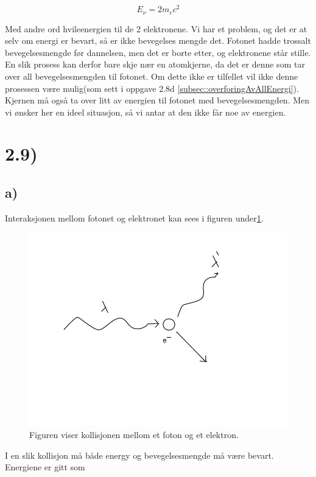 \documentclass[a4paper,norsk, 10pt]{article}
\begin{document}
$$
E_{\nu} = 2m_ec^2
$$

Med andre ord hvileenergien til de 2 elektronene. Vi har et problem, og det er at selv om energi er bevart, så er ikke bevegelses mengde det. Fotonet hadde trossalt bevegelsesmengde før dannelsen, men det er borte etter, og elektronene står stille. En slik prosess kan derfor bare skje nær en atomkjerne, da det er denne som tar over all bevegelsesmengden til fotonet. Om dette ikke er tilfellet vil ikke denne prosessen være mulig(som sett i oppgave 2.8d \ref{subsec::overforingAvAllEnergi}). Kjernen må også ta over litt av energien til fotonet med bevegelsesmengden. Men vi ønsker her en ideel situasjon, så vi antar at den ikke får noe av energien.

\section*{2.9)}

\subsection*{a)}
Interaksjonen mellom fotonet og elektronet kan sees i figuren under\ref{fig::photonElectronCollision}.

\begin{figure}[H]
\centering
\includegraphics[scale=.3]{comptonLambda.png}
\caption{Figuren viser kollisjonen mellom et foton og et elektron.}\label{fig::photonElectronCollision}
\end{figure}

I en slik kollisjon må både energy og bevegelsesmengde må være bevart. Energiene er gitt som
\end{document}
